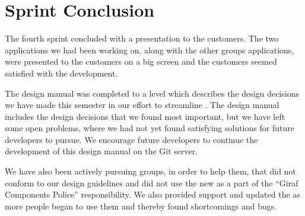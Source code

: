 
\chapter{Sprint Conclusion}
\label{cha:conclusion_sprint_4}

The fourth sprint concluded with a presentation to the customers. The two applications we had been working on, along with the other groups applications, were presented to the customers on a big screen and the customers seemed satisfied with the development. 

The design manual was completed to a level which describes the design decisions we have made this semester in our effort to streamline \giraf. The design manual includes the design decisions that we found most important, but we have left some open problems, where we had not yet found satisfying solutions for future \giraf developers to pursue. We encourage future \giraf developers to continue the development of this design manual on the \giraf Git server.    

We have also been actively pursuing groups, in order to help them, that did not conform to our design guidelines and did not use the new \gc as a part of the ``Giraf Components Police'' responsibility. We also provided support and updated the \gc as more people began to use them and thereby found shortcomings and bugs. 

